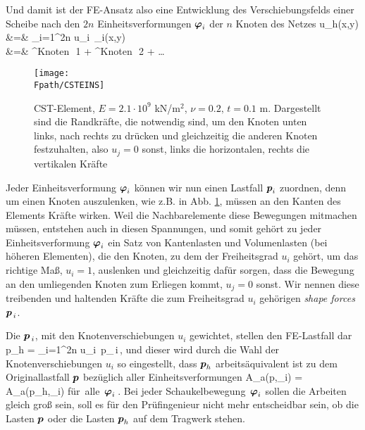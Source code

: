 {Und damit ist der FE-Ansatz also eine Entwicklung des Verschiebungsfelds einer Scheibe nach den $2n$
Einheitsverformungen $\mbox{\boldmath $\varphi$}_i$ der $n$ Knoten des Netzes
\bfo
\vek u_{h}(x,y) &=& \sum_{i=1}^{2n} u_i \,\vek \Np_i(x,y)\nn \\
&=& ^{Knoten \,\,1} + ^{Knoten \,\,2} + \ldots
\efo
\begin{figure}[tbp] \centering
\if {} \sidecaption \fi
\texttt{[image: \\Fpath/CSTEINS]}
\caption{CST-Element, $E = 2.1 \cdot 10^9$ kN/m$^2$, $\nu = 0.2,\, t = 0.1$ m.
Dargestellt sind die Randkr\"{a}fte, die notwendig sind, um den Knoten unten links, nach
rechts zu dr\"{u}cken und gleichzeitig die anderen Knoten festzuhalten, also $u_j = 0$ sonst, links die horizontalen, rechts die vertikalen Kr\"{a}fte}
\label{Elementkraefte}
\end{figure}%
Jeder Einheitsverformung $\mbox{\boldmath $\varphi$}_i$ k\"{o}nnen wir nun einen Lastfall $\mbox{\boldmath $p$}_i$ zuordnen, denn um einen Knoten auszulenken, wie z.B. in Abb. \ref{Elementkraefte}, m\"{u}ssen an den Kanten des Elements Kr\"{a}fte wirken. Weil die Nachbarelemente diese Bewegungen mitmachen m\"{u}ssen, entstehen auch in diesen Spannungen, und somit geh\"{o}rt zu jeder Einheitsverformung $\mbox{\boldmath $\varphi$}_i$ ein Satz von Kantenlasten und Volumenlasten (bei h\"{o}heren Elementen), die den Knoten, zu dem der Freiheitsgrad $u_i$ geh\"{o}rt, um das richtige Ma{\ss}, $u_i = 1$, auslenken und gleichzeitig daf\"{u}r sorgen, dass die Bewegung an den umliegenden Knoten zum Erliegen kommt, $u_j = 0$ sonst. Wir nennen diese treibenden und haltenden Kr\"{a}fte die zum Freiheitsgrad $u_i$ geh\"{o}rigen {\em shape forces\/} $\mbox{\boldmath $p$}_{\,i}$.

Die $\mbox{\boldmath $p$}_{\,i}$, mit den Knotenverschiebungen $u_i$ gewichtet, stellen den FE-Lastfall dar
\bfo
\vek p_{h} = \sum_{i=1}^{2n} u_i \,\vek p_{\,i}\,,
\efo
und dieser wird durch die Wahl der Knotenverschiebungen $u_i$ so eingestellt,
dass $\mbox{\boldmath $p$}_h$ arbeits\"{a}quivalent ist zu dem Originallastfall $\mbox{\boldmath $p$}$ bez\"{u}glich aller
Einheitsverformungen
\bfo
\delta A_a(\vek p,\vek \Np_i) = \delta A_a(\vek p_h,\vek \Np_i) \qquad \mbox{f\"{u}r alle
$\mbox{\boldmath $\varphi$}_i$}\,.
\efo
Bei jeder \glq Schaukelbewegung\grq\ $\mbox{\boldmath $\varphi$}_i$ sollen die Arbeiten gleich gro{\ss} sein, soll es f\"{u}r den Pr\"{u}fingenieur nicht mehr entscheidbar sein, ob die Lasten $\mbox{\boldmath $p$}$ oder die Lasten $\mbox{\boldmath $p$}_h$ auf dem Tragwerk stehen.



}
